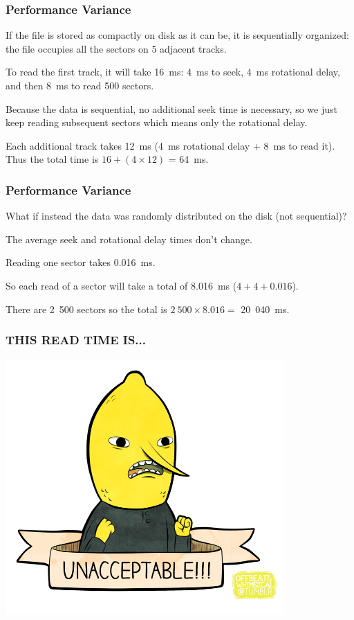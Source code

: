 \begin{frame}
\frametitle{Performance Variance}

If the file is stored as compactly on disk as it can be, it is \alert{sequentially organized}: the file occupies all the sectors on 5 adjacent tracks. 

To read the first track, it will take 16~ms: 4~ms to seek, 4~ms rotational delay, and then 8~ms to read 500 sectors. 

Because the data is sequential, no additional seek time is necessary, so we just keep reading subsequent sectors which means only the rotational delay. 

Each additional track takes 12~ms (4~ms rotational delay + 8~ms to read it). Thus the total time is $16 + (4 \times 12)$ = 64~ms.

\end{frame}

\begin{frame}
\frametitle{Performance Variance}

What if instead the data was randomly distributed on the disk (not sequential)? 

The average seek and rotational delay times don't change. 

Reading one sector takes 0.016~ms. 

So each read of a sector will take a total of 8.016~ms ($4 + 4 + 0.016$).

There are 2~500 sectors so the total is $2~500 \times 8.016 =$ 20~040~ms. 

\end{frame}



\begin{frame}
\frametitle{THIS READ TIME IS...}

\begin{center}
\includegraphics[width=0.8\textwidth]{images/unacceptable}
\end{center}

\end{frame}

